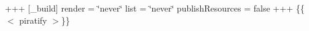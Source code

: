 +++ \mbox{[}\+\_\+build\mbox{]} render = \char`\"{}never\char`\"{} list = \char`\"{}never\char`\"{} publish\+Resources = false +++ \{\{$<$ piratify $>$\}\} 